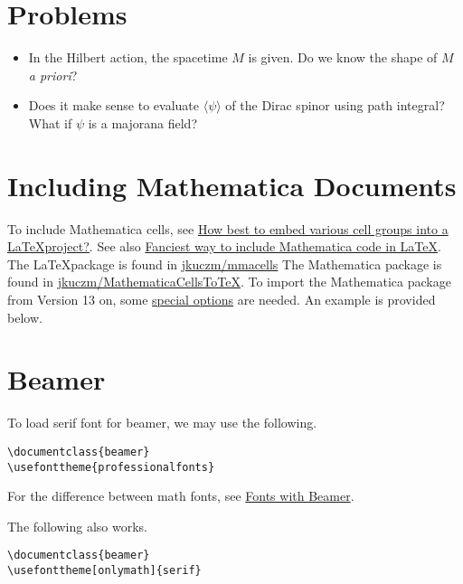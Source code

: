 \documentclass{article}
\begin{document}
\section{Problems}

\begin{itemize}
    \item In the Hilbert action, the spacetime $M$ is given.
    Do we know the shape of $M$ \textit{a priori}?
    \item Does it make sense to evaluate $\langle \psi \rangle$ of the Dirac spinor using path integral?
    What if $\psi$ is a majorana field?
\end{itemize}

\section{Including Mathematica Documents}

To include Mathematica cells, see \href{https://mathematica.stackexchange.com/questions/73223/how-best-to-embed-various-cell-groups-into-a-latex-project/73589#73589}{How best to embed various cell groups into a \LaTeX project?}. See also \href{https://tex.stackexchange.com/questions/84748/fanciest-way-to-include-mathematica-code-in-latex}{Fanciest way to include Mathematica code in LaTeX}.
The \LaTeX package is found in \href{https://github.com/jkuczm/mmacells}{jkuczm/mmacells}
The Mathematica package is found in \href{https://github.com/jkuczm/MathematicaCellsToTeX/issues/31}{jkuczm/MathematicaCellsToTeX}.
To import the Mathematica package from Version 13 on, some \href{https://github.com/jkuczm/MathematicaCellsToTeX/issues/31}{special options} are needed.
An example is provided below.



\section{Beamer}

To load serif font for beamer, we may use the following.
\begin{verbatim}
\documentclass{beamer}
\usefonttheme{professionalfonts}
\end{verbatim}
For the difference between math fonts, see \href{https://www.logicmatters.net/resources/pdfs/MathFonts.pdf}{Fonts with Beamer}.

The following also works.
\begin{verbatim}
\documentclass{beamer}
\usefonttheme[onlymath]{serif}
\end{verbatim}
\end{document}
